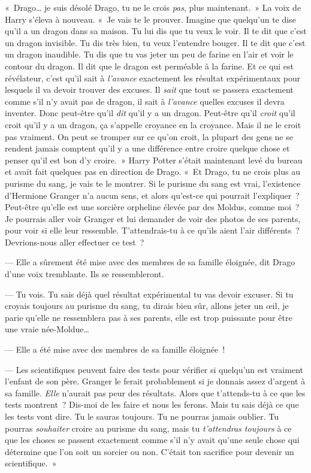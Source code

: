 «~Drago… je suis désolé Drago, tu ne le crois \emph{pas}, plus maintenant.~» La voix de Harry s'éleva à nouveau. «~Je vais te le prouver. Imagine que quelqu'un te dise qu'il a un dragon dans sa maison. Tu lui dis que tu veux le voir. Il te dit que c'est un dragon invisible. Tu dis très bien, tu veux l'entendre bouger. Il te dit que c'est un dragon inaudible. Tu dis que tu vas jeter un peu de farine en l'air et voir le contour du dragon. Il dit que le dragon est perméable à la farine. Et ce qui est révélateur, c'est qu'il sait à \emph{l'avance} exactement les résultat expérimentaux pour lesquels il va devoir trouver des excuses. Il \emph{sait} que tout se passera exactement comme s'il n'y avait pas de dragon, il sait à \emph{l'avance} quelles excuses il devra inventer. Donc peut-être qu'il \emph{dit} qu'il y a un dragon. Peut-être qu'il \emph{croit} qu'il croit qu'il y a un dragon, ça s'appelle croyance en la croyance. Mais il ne le croit pas vraiment. On peut se tromper sur ce qu'on croit, la plupart des gens ne se rendent jamais comptent qu'il y a une différence entre croire quelque chose et penser qu'il est bon d'y croire.~» Harry Potter s'était maintenant levé du bureau et avait fait quelques pas en direction de Drago. «~Et Drago, tu ne crois plus au purisme du sang, je vais te le montrer. Si le purisme du sang est vrai, l'existence d'Hermione Granger n'a aucun sens, et alors qu'est-ce qui pourrait l'expliquer~? Peut-être qu'elle est une sorcière orpheline élevée par des Moldus, comme moi~? Je pourrais aller voir Granger et lui demander de voir des photos de ses parents, pour voir si elle leur ressemble. T'attendrais-tu à ce qu'ils aient l'air différents~? Devrions-nous aller effectuer ce test~?

--- Elle a sûrement été mise avec des membres de sa famille éloignée, dit Drago d’une voix tremblante. Ils se ressembleront.

--- Tu vois. Tu sais déjà quel résultat expérimental tu vas devoir excuser. Si tu croyais toujours au purisme du sang, tu dirais bien sûr, allons jeter un œil, je parie qu'elle ne ressemblera pas à ses parents, elle est trop puissante pour être une vraie née-Moldue…

--- Elle a été mise avec des membres de sa famille éloignée~!

--- Les scientifiques peuvent faire des tests pour vérifier si quelqu'un est vraiment l'enfant de son père. Granger le ferait probablement si je donnais assez d'argent à sa famille. \emph{Elle} n'aurait pas peur des résultats. Alors que t'attends-tu à ce que les tests montrent~? Dis-moi de les faire et nous les ferons. Mais tu sais déjà ce que les tests vont dire. Tu le sauras toujours. Tu ne pourras jamais oublier. Tu pourras \emph{souhaiter} croire au purisme du sang, mais tu \emph{t'attendras toujours} à ce que les choses se passent exactement comme s'il n'y avait qu'une seule chose qui détermine que l'on soit un sorcier ou non. C'était ton sacrifice pour devenir un scientifique.~»


